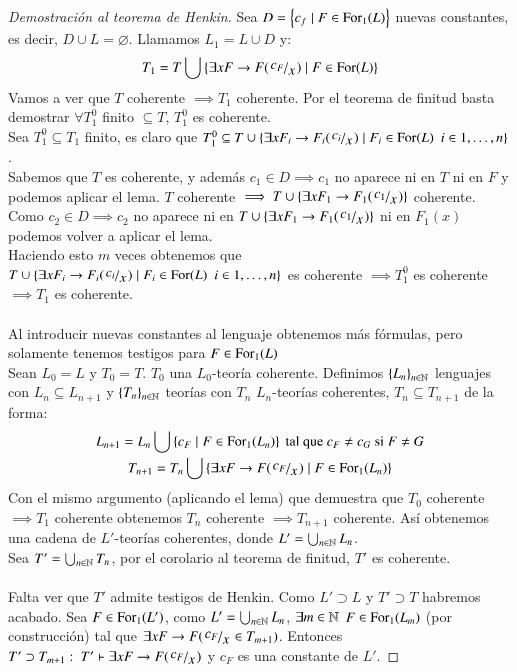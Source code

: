 \begin{proof}[Demostración al teorema de Henkin]
    Sea $D = \left\{c_f \mid F \in \mathrm{For}_1(L)\right\}$ nuevas constantes, es decir, $D \cup L = \varnothing$. Llamamos $L_1 = L \cup D$ y:
    $$
        T_1 = T \bigcup \sdf{\exists x F \then F(\quox{c_F}) \mid F \in \for(L)}
    $$
    Vamos a ver que $T$ coherente $\implies T_1$ coherente. Por el teorema de finitud basta demostrar $\forall T_1^0$ finito $\subseteq T$, $T_1^0$ es coherente.\\
    Sea $T_1^0 \subseteq T_1$ finito, es claro que $T_1^0 \subseteq T \cup \sdf{\exists x F_i \then F_i(\quox{c_i}) \mid F_i \in \for(L)\ \ i\in 1,\ldots,n}$.\\
    Sabemos que $T$ es coherente, y además $c_1 \in D \implies c_1$ no aparece ni en $T$ ni en $F$ y podemos aplicar el lema. $T$ coherente $\implies T \cup \sdf{\exists x F_1 \then F_1(\quox{c_1})}$ coherente.\\
    Como  $c_2 \in D \implies c_2$ no aparece ni en $T \cup \sdf{\exists x F_1 \then F_1(\quox{c_1})}$ ni en $F_1(x)$ podemos volver a aplicar el lema.\\
    Haciendo esto $m$ veces obtenemos que $T \cup \sdf{\exists x F_i \then F_i(\quox{c_i}) \mid F_i \in \for(L)\ \ i\in 1,\ldots,n}$ es coherente $\implies T_1^0$ es coherente $\implies T_1$ es coherente.\\\\

    Al introducir nuevas constantes al lenguaje obtenemos más fórmulas, pero solamente tenemos testigos para $F \in \mathrm{For}_1(L)$\\
    Sean $L_0 = L$ y $T_0 = T$. $T_0$ una $L_0$-teoría coherente. Definimos $\left\{L_n\right\}_{n\in\mathbb{N}}$ lenguajes con $L_n \subseteq L_{n+1}$ y $\left\{T_n\right\}_{n\in\mathbb{N}}$ teorías con $T_n$ $L_n$-teorías coherentes, $T_n \subseteq T_{n+1}$ de la forma:
    \begin{gather*}
        L_{n+1} = L_n \bigcup \sdf{c_F \mid F \in \for_1(L_n)} \text{ tal que } c_F \neq c_G \text{ si } F \neq G\\
        T_{n+1} = T_n \bigcup \sdf{\exists x F \then F(\quox{c_F}) \mid F \in \for_1(L_n)}
    \end{gather*}
    Con el mismo argumento (aplicando el lema) que demuestra que $T_0$ coherente $\implies T_1$ coherente obtenemos $T_n$ coherente $\implies T_{n+1}$ coherente. Así obtenemos una cadena de $L'$-teorías coherentes, donde $L' = \bigcup_{n\in\mathbb{N}} L_n$.\\
    Sea $T' = \bigcup_{n\in\mathbb{N}} T_n$, por el corolario al teorema de finitud, $T'$ es coherente.\\\\

    Falta ver que $T'$ admite testigos de Henkin. Como $L' \supset L$ y $T' \supset T$ habremos acabado. Sea $F \in \mathrm{For}_1(L')$, como $L' = \bigcup_{n\in\mathbb{N}} L_n$, $\exists m\in\mathbb{N}$ $F \in \mathrm{For}_1(L_m)$ (por construcción) tal que $\exists x F \then F(\quox{c_F} \in T_{m+1})$. Entonces $T' \supset T_{m+1}:\ T'\vdash \exists x F \then F(\quox{c_F})$ y $c_F$ es una constante de $L'$.
\end{proof}
